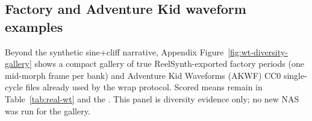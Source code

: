 \subsection{Factory and Adventure Kid waveform examples}
\label{sec:wt-gallery}

Beyond the synthetic sine{+}cliff narrative, Appendix Figure~\ref{fig:wt-diversity-gallery} shows a compact gallery of true ReelSynth-exported factory periods (one mid-morph frame per bank) and Adventure Kid Waveforms (AKWF) CC0 single-cycle files already used by the wrap protocol.
Scored means remain in Table~\ref{tab:real-wt} and the .
This panel is diversity evidence only; no new NAS was run for the gallery.
